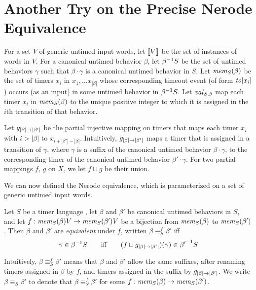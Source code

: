 \section{Another Try on the Precise Nerode Equivalence}


For a set $V$ of generic untimed input words, let $\instancesof{V}$ be the
set of instances of words in $V$. For a canonical untimed
behavior $\beta$, let $\suffixbehs{S}{\beta}$ be the set of untimed behaviors
$\gamma$ such that
$\beta\cdot\gamma$ is a canonical untimed behavior in $S$. Let
$\getmemorable{S}{\beta}$ be the set of timers $x_i$ in
$x_1 , \ldots x_{|\beta|}$ whose corresponding timeout event
(of form $\toevent{x_i}$) occurs (as an input) in some untimed behavior in
$\suffixbehs{S}{\beta}$.
Let $\getassignment{S}{\beta}$ map each timer $x_i$ in
$\getmemorable{S}{\beta}$ to the unique positive integer to which it
is assigned in the $i$th transition of that behavior.


Let $\suffbij{\beta}{\beta'}$ be the partial injective mapping
on timers that maps each
timer $x_i$ with $i > |\beta|$ to $x_{i + |\beta'| - |\beta|}$.
Intuitively, $\suffbij{\beta}{\beta'}$ maps a timer that is assigned 
in a transition of $\gamma$, where $\gamma$ is a suffix of the canonical
untimed behavior $\beta \cdot \gamma$, to the corresponding timer of
the canonical untimed behavior $\beta'\cdot\gamma$.
For two partial mappings $f$, $g$ on $X$, we let $f \sqcup g$ be their
union. 

We can now defined the Nerode equivalence, which is parameterized
on a set of generic untimed input words.

\begin{definition}
  \label{def:bj-nerode}
Let $S$ be a timer language ,
let $\beta$ and $\beta'$ be canonical untimed behaviors in $S$,
and let $f : \getmemorable{S}{\beta}{V} \to \getmemorable{S}{\beta'}{V}$
be a bijection
from $\getmemorable{S}{\beta}$ to $\getmemorable{S}{\beta'}$.
Then $\beta$ and $\beta'$ are \emph{equivalent} under $f$, written
$\beta \equiv_{S}^f \beta'$ iff
\[
\gamma \in \suffixbehs{S}{\beta}
\qquad \mbox{iff} \qquad
(f \sqcup \suffbij{\beta}{\beta'}) (\gamma) \in \suffixbehs{S}{\beta'}
\]
\end{definition}
Intuitively, $\beta \equiv_{S}^f \beta'$ means that $\beta$ and $\beta'$
allow the same suffixes, after renaming
timers assigned in $\beta$ by $f$, and timers assigned in the suffix by
$\suffbij{\beta}{\beta'}$.
We write $\beta \equiv_{S} \beta'$ to denote that
$\beta \equiv_{S}^f \beta'$ for some
$f : \getmemorable{S}{\beta} \to \getmemorable{S}{\beta'}$.

